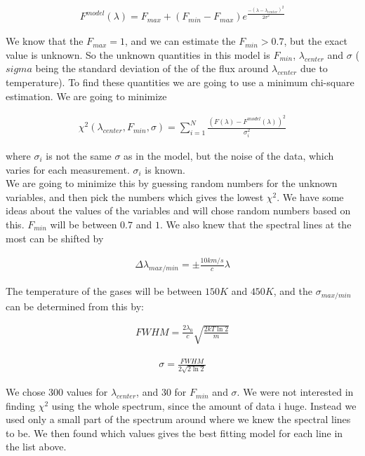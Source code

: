 \documentclass[a4paper, 10pt]{article}
\begin{document}
\begin{align}
F^{model}(\lambda) = F_{max} +(F_{min} - F_{max})e^{\frac{-(\lambda - \lambda_{center})^2}{2\sigma^2}}
\end{align}

We know that the $F_{max} = 1$, and we can estimate the $F_{min}>0.7$, but the exact value is unknown. So the unknown quantities in this model is $F_{min}$, $\lambda_{center}$ and $\sigma$ ($sigma$ being the standard deviation of the of the flux around $\lambda_{center}$ due to temperature). To find these quantities we are going to use a minimum chi-square estimation. We are going to minimize

\begin{align}
\chi^2(\lambda_{center},F_{min},\sigma) = \sum_{i = 1}^N \frac{(F(\lambda) - F^{model}(\lambda))^2}{\sigma_i^2}
\end{align}

where $\sigma_i$ is not the same $\sigma$ as in the model, but the noise of the data, which varies for each measurement. $\sigma_i$ is known.\\

We are going to minimize this by guessing random numbers for the unknown variables, and then pick the numbers which gives the lowest $\chi^2$. We have some ideas about the values of the variables and will chose random numbers based on this. $F_{min}$ will be between $0.7$ and $1$. We also knew that the spectral lines at the most can be shifted by

\begin{align}
\Delta \lambda_{max/min} = \pm \frac{10 km/s}{c} \lambda
\end{align}

The temperature of the gases will be between $150K$ and $450K$, and the $\sigma_{max/min}$ can be determined from this by:

\begin{align}
FWHM = \frac{2 \lambda_0}{c}\sqrt{\frac{2kT \ln 2}{m}}
\end{align}

\begin{align}
\sigma = \frac{FWHM}{2\sqrt{2 \ln 2}}
\end{align}

We chose 300 values for $\lambda_{center}$, and 30 for $F_{min}$ and $\sigma$. We were not interested in finding $\chi^2$ using the whole spectrum, since the amount of data i huge. Instead we used only a small part of the spectrum around where we knew the spectral lines to be. We then found which values gives the best fitting model for each line in the list above.\\
\end{document}
